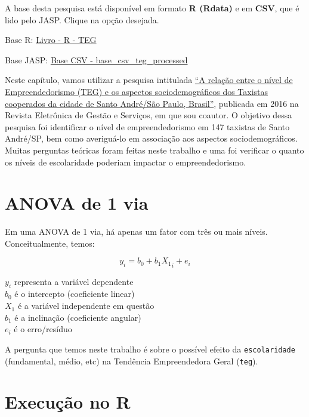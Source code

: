 \documentclass[
]{book}
\begin{document}
A base desta pesquisa está disponível em formato \textbf{R (Rdata)} e em \textbf{CSV}, que é lido pelo JASP. Clique na opção desejada.

Base R: \href{https://github.com/anovabr/mqt/raw/master/bases/Livro\%20-\%20R\%20-\%20TEG.RData}{Livro - R - TEG}

Base JASP: \href{https://github.com/anovabr/mqt/raw/master/bases/bases_csv_jasp.zip}{Base CSV - base\_csv\_teg\_processed}

Neste capítulo, vamos utilizar a pesquisa intitulada \href{https://www.metodista.br/revistas/revistas-metodista/index.php/REGS/article/view/6453}{``A relação entre o nível de Empreendedorismo (TEG) e os aspectos sociodemográficos dos Taxistas cooperados da cidade de Santo André/São Paulo, Brasil''}, publicada em 2016 na Revista Eletrônica de Gestão e Serviços, em que sou coautor. O objetivo dessa pesquisa foi identificar o nível de empreendedorismo em 147 taxistas de Santo André/SP, bem como averiguá-lo em associação aos aspectos sociodemográficos. Muitas perguntas teóricas foram feitas neste trabalho e uma foi verificar o quanto os níveis de escolaridade poderiam impactar o empreendedorismo.

\hypertarget{anova-de-1-via}{%
\section{ANOVA de 1 via}\label{anova-de-1-via}}

Em uma ANOVA de 1 via, há apenas um fator com três ou mais níveis. Conceitualmente, temos:

\[y_i = b_0 + b_1X{_1}_i + e_i\]

\(y_i\) representa a variável dependente\\
\(b_0\) é o intercepto (coeficiente linear)\\
\(X_1\) é a variável independente em questão\\
\(b_1\) é a inclinação (coeficiente angular)\\
\(e_i\) é o erro/resíduo

A pergunta que temos neste trabalho é sobre o possível efeito da \texttt{escolaridade} (fundamental, médio, etc) na Tendência Empreendedora Geral (\texttt{teg}).

\hypertarget{execuuxe7uxe3o-no-r-6}{%
\section{Execução no R}\label{execuuxe7uxe3o-no-r-6}}
\end{document}
